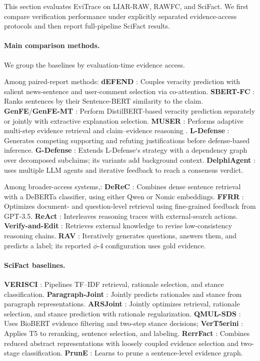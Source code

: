 \documentclass[letterpaper]{article}
\begin{document}
This section evaluates EviTrace on LIAR-RAW, RAWFC, and SciFact. We
first compare verification performance under explicitly separated
evidence-access protocols and then report full-pipeline SciFact results.

\paragraph{Main comparison methods.}
We group the baselines by evaluation-time evidence access.

Among paired-report methods: 
\textbf{dEFEND} \citep{Shu2019dEFEND}: Couples veracity prediction with salient news-sentence and user-comment selection via co-attention.
\textbf{SBERT-FC} \citep{Kotonya2020PublicHealth}: Ranks sentences by their
Sentence-BERT similarity to the claim.
\textbf{GenFE}/\textbf{GenFE-MT} \citep{Atanasova2020Generating}: Perform DistilBERT-based veracity prediction separately or jointly with extractive explanation selection.
\textbf{MUSER}\citep{Liao2023MUSER} : Performs adaptive multi-step evidence retrieval and
claim--evidence reasoning .
\textbf{L-Defense} \citep{Wang2024LDefense}: Generates competing supporting and refuting
justifications before defense-based inference.
\textbf{G-Defense} \citep{Wang2026GDefense}: Extends L-Defense‘s strategy with a dependency graph over decomposed subclaims; its variants add background context.
\textbf{DelphiAgent} \citep{Xiong2025DelphiAgent}: uses multiple LLM agents and iterative feedback to reach a consensus verdict.

Among broader-access systems,:
\textbf{DeReC} \citep{Qazi2025DeReC}: Combines dense sentence
retrieval with a DeBERTa classifier, using either Qwen or Nomic
embeddings.
\textbf{FFRR} \citep{Zhang2024FFRR}: Optimizes document- and question-level retrieval using
fine-grained feedback from GPT-3.5.
\textbf{ReAct} \citep{Yao2023ReAct}: Interleaves reasoning traces with external-search
actions.
\textbf{Verify-and-Edit}  \citep{Zhao2023VerifyEdit}: Retrieves external knowledge to revise
low-consistency reasoning chains.
\textbf{RAV} \citep{Shukla2025RAV}: Iteratively generates questions, answers them,
and predicts a label; its reported $\phi$-4 configuration uses gold
evidence.

\paragraph{SciFact baselines.}
\textbf{VERISCI} \citep{Wadden2020SciFact}: Pipelines TF--IDF retrieval, rationale selection,
and stance classification.
\textbf{Paragraph-Joint} \citep{Li2021ParagraphJoint}: Jointly predicts rationales and stance
from paragraph representations.
\textbf{ARSJoint} \citep{Zhang2021ARSJoint}: Jointly optimizes retrieval, rationale selection,
and stance prediction with rationale regularization.
\textbf{QMUL-SDS} \citep{Zeng2021QMULSDS}: Uses BioBERT evidence filtering and two-step
stance decisions;
\textbf{VerT5erini} \citep{Pradeep2021VerT5erini}: Applies T5 to reranking, sentence selection,
and labeling.
\textbf{RerrFact} \citep{Rana2022RerrFact}: Combines reduced abstract representations with
loosely coupled evidence selection and two-stage classification.
\textbf{PrunE} \citep{Fang2025PrunE}: Learns to prune a
sentence-level evidence graph.
\end{document}
